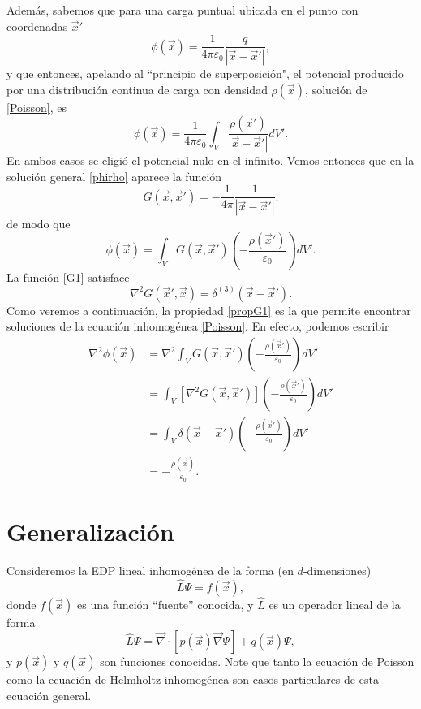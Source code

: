Además, sabemos que para una carga puntual ubicada en el punto con coordenadas $\vec{x}'$
\begin{equation}
\phi(\vec{x})=\frac{1}{4\pi\varepsilon_0}\frac{q}{\left|\vec{x}-\vec{x}'\right|},
\end{equation}
y que entonces, apelando al ``principio de superposición", el potencial producido por una distribución continua de carga con densidad $\rho(\vec{x})$, solución de \eqref{Poisson}, es
\begin{equation}\label{phirho}
\phi(\vec{x})=\frac{1}{4\pi\varepsilon_0}\int_V\frac{\rho(\vec{x}')}{\left|\vec{x}-\vec{x}'\right|}dV'.
\end{equation}
En ambos casos se eligió el potencial nulo en el infinito. Vemos entonces que en la solución general \eqref{phirho} aparece la función
\begin{equation}\label{G1}
G(\vec{x},\vec{x}')=-\frac{1}{4\pi}\frac{1}{\left|\vec{x}-\vec{x}'\right|}.
\end{equation}
de modo que 
\begin{equation}\label{phirho2}
\phi(\vec{x})=\int_V G(\vec{x},\vec{x}')\left(-\frac{\rho(\vec{x}')}{\varepsilon_0}\right)dV'.
\end{equation}
La función \eqref{G1} satisface
\begin{equation}\label{propG1}
\nabla^2G(\vec{x}',\vec{x})=\delta^{(3)}(\vec{x}-\vec{x}').
\end{equation}
Como veremos a continuación, la propiedad \eqref{propG1} es la que permite encontrar soluciones de la ecuación inhomogénea \eqref{Poisson}. En efecto, podemos escribir
\begin{align}
\nabla^2\phi(\vec{x}) &= \nabla^2\int_V G(\vec{x},\vec{x}')\left(-\frac{\rho(\vec{x}')} {\varepsilon_0}\right)dV'\\
&= \int_V \left[\nabla^2G(\vec{x},\vec{x}')\right]\left(-\frac{\rho(\vec{x}')}{\varepsilon_0}\right)dV' \\
&= \int_V \delta(\vec{x}-\vec{x}')\left(-\frac{\rho(\vec{x}')}{\varepsilon_0}\right)dV'\\
&= -\frac{\rho(\vec{x})}{\varepsilon_0}.
\end{align}


\section{Generalización}
Consideremos la EDP lineal inhomogénea de la forma (en $d$-dimensiones)
\begin{equation}\label{EDP1}
\hat{L}\Psi=f(\vec{x}),
\end{equation}
donde $f(\vec{x})$ es una función ``fuente'' conocida, y $\hat{L}$ es un operador lineal de la forma
\begin{equation}
\hat{L}\Psi=\vec\nabla\cdot\left[p(\vec{x})\vec\nabla\Psi\right]+q(\vec{x})\Psi,
\end{equation}
y $p(\vec{x})$ y $q(\vec{x})$ son funciones conocidas. Note que tanto la ecuación de Poisson como la ecuación de Helmholtz inhomogénea son casos particulares de esta ecuación general.

